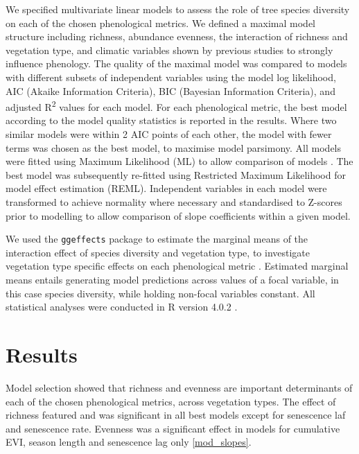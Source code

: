 \documentclass[11pt,a4paper]{article}
\begin{document}
We specified multivariate linear models to assess the role of tree species diversity on each of the chosen phenological metrics. We defined a maximal model structure including richness, abundance evenness, the interaction of richness and vegetation type, and climatic variables shown by previous studies to strongly influence phenology. The quality of the maximal model was compared to models with different subsets of independent variables using the model log likelihood, AIC (Akaike Information Criteria), BIC (Bayesian Information Criteria), and adjusted R\textsuperscript{2} values for each model. For each phenological metric, the best model according to the model quality statistics is reported in the results. Where two similar models were within 2 AIC points of each other, the model with fewer terms was chosen as the best model, to maximise model parsimony. All models were fitted using Maximum Likelihood (ML) to allow comparison of models \citep{}. The best model was subsequently re-fitted using Restricted Maximum Likelihood for model effect estimation (REML). Independent variables in each model were transformed to achieve normality where necessary and standardised to Z-scores prior to modelling to allow comparison of slope coefficients within a given model.

We used the \texttt{ggeffects} package to estimate the marginal means of the interaction effect of species diversity and vegetation type, to investigate vegetation type specific effects on each phenological metric \citep{ggeffects}. Estimated marginal means entails generating model predictions across values of a focal variable, in this case species diversity, while holding non-focal variables constant. All statistical analyses were conducted in R version 4.0.2 \citep{R2020}.

\section{Results}

Model selection showed that richness and evenness are important determinants of each of the chosen phenological metrics, across vegetation types. The effect of richness featured and was significant in all best models except for senescence laf and senescence rate. Evenness was a significant effect in models for cumulative EVI, season length and senescence lag only \autoref{mod_slopes}.
\end{document}
